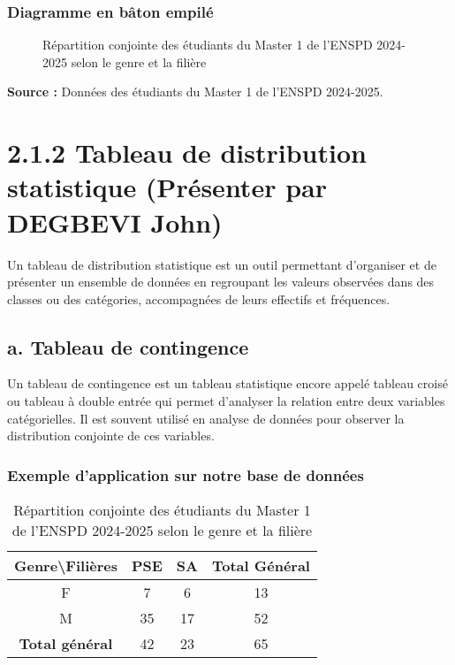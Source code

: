 \documentclass[a4paper,12pt]{article}
\begin{document}
\subsubsection{Diagramme en bâton empilé}
\begin{figure}[h]
    \centering
 
    \caption{Répartition conjointe des étudiants du Master 1 de l’ENSPD 2024-2025 selon le genre et la filière}
    \label{fig:baton_empile}
\end{figure}
\textbf{Source :} Données des étudiants du Master 1 de l’ENSPD 2024-2025.

\section{2.1.2 Tableau de distribution statistique (Présenter par DEGBEVI John)}

Un tableau de distribution statistique est un outil permettant d'organiser et de présenter un ensemble de données en regroupant les valeurs observées dans des classes ou des catégories, accompagnées de leurs effectifs et fréquences.

\subsection{a. Tableau de contingence}

Un tableau de contingence est un tableau statistique encore appelé tableau croisé ou tableau à double entrée qui permet d’analyser la relation entre deux variables catégorielles. Il est souvent utilisé en analyse de données pour observer la distribution conjointe de ces variables.

\subsubsection*{Exemple d’application sur notre base de données}
\begin{table}[h!]
\centering
\caption{Répartition conjointe des étudiants du Master 1 de l’ENSPD 2024-2025 selon le genre et la filière}
\begin{tabular}{|c|c|c|c|}
\hline
\textbf{Genre\textbackslash Filières} & \textbf{PSE} & \textbf{SA} & \textbf{Total Général} \\
\hline
F & 7 & 6 & 13 \\
M & 35 & 17 & 52 \\
\hline
\textbf{Total général} & 42 & 23 & 65 \\
\hline
\end{tabular}
\end{table}
\end{document}
